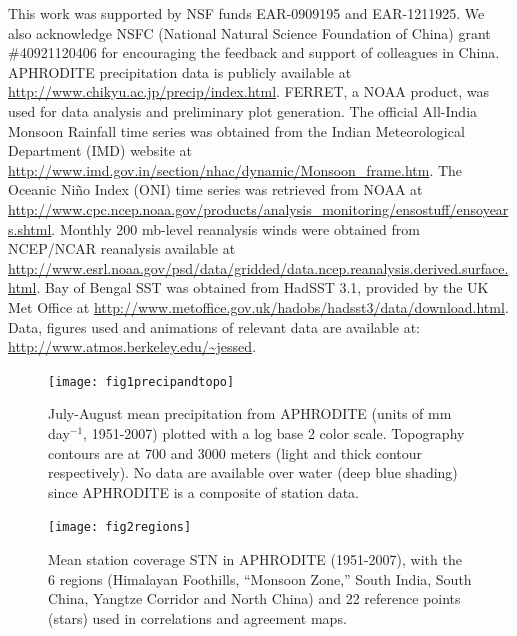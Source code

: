 \documentclass[12pt]{article}
\begin{document}
\begin{acknowledgment} 
	This work was supported by NSF funds EAR-0909195 and EAR-1211925. We also acknowledge NSFC (National Natural Science Foundation of China) grant \#40921120406 for encouraging the feedback and support of colleagues in China. APHRODITE precipitation data is publicly available at \url{http://www.chikyu.ac.jp/precip/index.html}. FERRET, a NOAA product, was used for data analysis and preliminary plot generation. The official All-India Monsoon Rainfall time series was obtained from the Indian Meteorological Department (IMD) website at \url{http://www.imd.gov.in/section/nhac/dynamic/Monsoon_frame.htm}. The Oceanic Ni\~no Index (ONI) time series was retrieved from NOAA at \url{http://www.cpc.ncep.noaa.gov/products/analysis_monitoring/ensostuff/ensoyears.shtml}. Monthly 200 mb-level reanalysis winds were obtained from NCEP/NCAR reanalysis available at \url{http://www.esrl.noaa.gov/psd/data/gridded/data.ncep.reanalysis.derived.surface.html}. Bay of Bengal SST was obtained from HadSST 3.1, provided by the UK Met Office at \url{http://www.metoffice.gov.uk/hadobs/hadsst3/data/download.html}. Data, figures used and animations of relevant data are available at: \url{http://www.atmos.berkeley.edu/~jessed}.
\end{acknowledgment}

\pagestyle{plain}
{}
{\clearpage}



\begin{figure}[t]
  \noindent\texttt{[image: fig1precipandtopo]}\\
  \caption{July-August mean precipitation from APHRODITE (units of mm day$^{-1}$, 1951-2007) plotted with a log base 2 color scale. Topography contours are at 700 and 3000 meters (light and thick contour respectively). No data are available over water (deep blue shading) since APHRODITE is a composite of station data.}\label{f1}
\end{figure}

\begin{figure}[t]
  \noindent\texttt{[image: fig2regions]}\\
  \caption{Mean station coverage STN in APHRODITE (1951-2007), with the 6 regions (Himalayan Foothills, ``Monsoon Zone,'' South India, South China, Yangtze Corridor and North China) and 22 reference points (stars) used in correlations and agreement maps.}\label{f2}
\end{figure}
\end{document}
